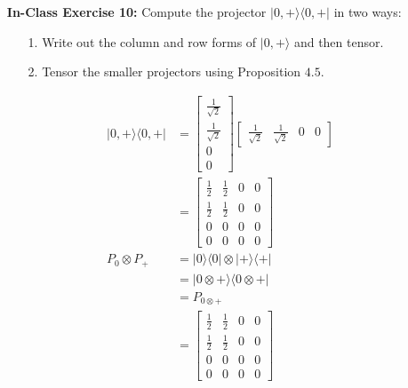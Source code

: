 \documentclass[main.tex]{subfiles}
\begin{document}
\begin{enumerate}
\item[] \textbf{In-Class Exercise 10:} Compute the projector $|0,+\rangle\langle 0,+|$ in two ways:
    \begin{enumerate}
        \item[1.] Write out the column and row forms of $|0,+\rangle$ and then tensor.
        \item[2.] Tensor the smaller projectors using Proposition $4.5$.
    \end{enumerate}
    
    \begin{align*}
        |0,+\rangle\langle 0,+| & = \left[\begin{array}{l} \frac{1}{\sqrt{2}} \\ \frac{1}{\sqrt{2}} \\ 0 \\ 0 \end{array}\right]
                                \left[\begin{array}{llll} \frac{1}{\sqrt{2}} & \frac{1}{\sqrt{2}} & 0 & 0 \end{array}\right]\\
                                & = \left[\begin{array}{llll} \frac{1}{2}&\frac{1}{2}&0&0\\\frac{1}{2}&\frac{1}{2}&0&0\\
                                0&0&0&0\\0&0&0&0\end{array}\right]\\
        P_{0} \otimes P_{+}     & = |0\rangle\langle 0|\otimes| +\rangle\langle +| \\
                                & = |0 \otimes +\rangle\langle 0 \otimes +| \\
                                & = P_{0 \otimes +}\\
                                & = \left[\begin{array}{llll} \frac{1}{2}&\frac{1}{2}&0&0\\\frac{1}{2}&\frac{1}{2}&0&0\\
                                0&0&0&0\\0&0&0&0\end{array}\right]
    \end{align*}


\end{enumerate}
\end{document}
